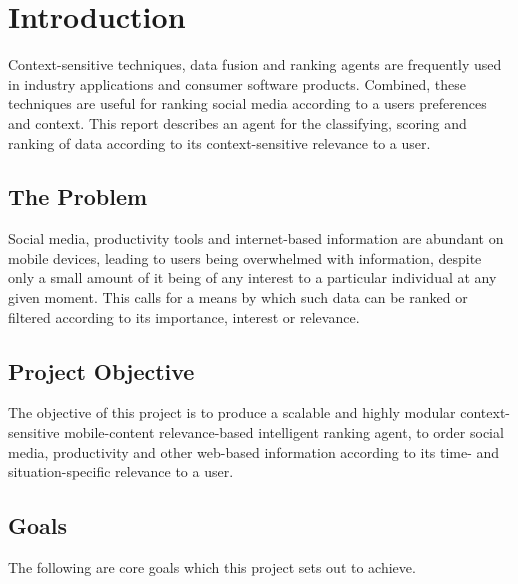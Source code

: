 \chapter{Introduction}

Context-sensitive techniques, data fusion and ranking agents are frequently used in industry applications and consumer software products. Combined, these techniques are useful for ranking social media according to a users preferences and context. This report describes an agent for the classifying, scoring and ranking of data according to its context-sensitive relevance to a user.

\section{The Problem}

Social media, productivity tools and internet-based information are abundant on mobile devices, leading to users being overwhelmed with information, despite only a small amount of it being of any interest to a particular individual at any given moment. This calls for a means by which such data can be ranked or filtered according to its importance, interest or relevance.

\section{Project Objective}

The objective of this project is to produce a scalable and highly modular context-sensitive mobile-content relevance-based intelligent ranking agent, to order social media, productivity and other web-based information according to its time- and situation-specific relevance to a user.

\section{Goals}

The following are core goals which this project sets out to achieve.

